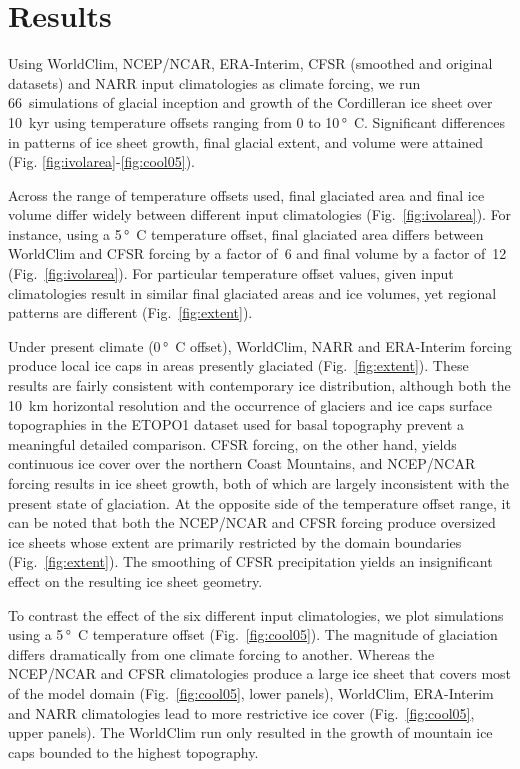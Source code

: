 \section{Results}
\label{sec:results}

Using WorldClim, NCEP/NCAR, ERA-Interim, CFSR (smoothed and original datasets) and NARR input climatologies as climate forcing, we run 66~simulations of glacial inception and growth of the Cordilleran ice sheet over 10~kyr using temperature offsets ranging from 0 to 10\,\unit{\degree C}. Significant differences in patterns of ice sheet growth, final glacial extent, and volume were attained (Fig. \ref{fig:ivolarea}-\ref{fig:cool05}).

Across the range of temperature offsets used, final glaciated area and final ice volume differ widely between different input climatologies (Fig.~\ref{fig:ivolarea}). For instance, using a 5\,\unit{\degree C} temperature offset, final glaciated area differs between WorldClim and CFSR forcing by a factor of~6 and final volume by a factor of~12 (Fig.~\ref{fig:ivolarea}). For particular temperature offset values, given input climatologies result in similar final glaciated areas and ice volumes, yet regional patterns are different (Fig.~\ref{fig:extent}).

Under present climate (0\,\unit{\degree C} offset), WorldClim, NARR and ERA-Interim forcing produce local ice caps in areas presently glaciated (Fig.~\ref{fig:extent}). These results are fairly consistent with contemporary ice distribution, although both the 10~km horizontal resolution and the occurrence of glaciers and ice caps surface topographies in the ETOPO1 dataset used for basal topography prevent a meaningful detailed comparison. CFSR forcing, on the other hand, yields continuous ice cover over the northern Coast Mountains, and NCEP/NCAR forcing results in ice sheet growth, both of which are largely inconsistent with the present state of glaciation. At the opposite side of the temperature offset range, it can be noted that both the NCEP/NCAR and CFSR forcing produce oversized ice sheets whose extent are primarily restricted by the domain boundaries (Fig.~\ref{fig:extent}). The smoothing of CFSR precipitation yields an insignificant effect on the resulting ice sheet geometry.

To contrast the effect of the six different input climatologies, we plot simulations using a 5\,\unit{\degree C} temperature offset (Fig.~\ref{fig:cool05}). The magnitude of glaciation differs dramatically from one climate forcing to another. Whereas the NCEP/NCAR and CFSR climatologies produce a large ice sheet that covers most of the model domain (Fig.~\ref{fig:cool05}, lower panels), WorldClim, ERA-Interim and NARR climatologies lead to more restrictive ice cover (Fig.~\ref{fig:cool05}, upper panels). The WorldClim run only resulted in the growth of mountain ice caps bounded to the highest topography.
